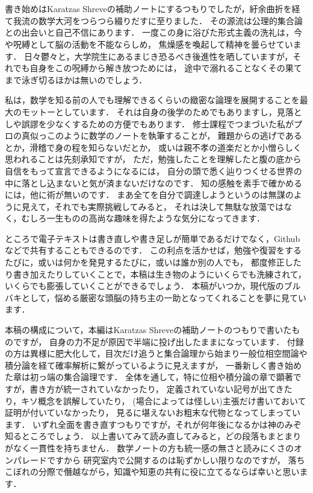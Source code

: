 \chapter*{}
書き始めはKaratzas Shreveの補助ノートにするつもりでしたが，紆余曲折を経て我流の数学大河をつらつら綴りだすに至りました．
その源流は公理的集合論との出会いと自己不信にあります．
一度この身に浴びた形式主義の洗礼は，今や呪縛として脳の活動を不能ならしめ，
焦燥感を喚起して精神を曇らせています．
日々鬱々と，大学院生にあるまじき恐るべき後進性を晒していますが，それでも自身をこの呪縛から解き放つためには，
途中で溺れることなくその果てまで泳ぎ切るほかは無いのでしょう．

私は，数学を知る前の人でも理解できるくらいの緻密な論理を展開することを最大のモットーとしています．
それは自身の後学のためでもありますし，見落としや誤謬を少なくするための方便でもあります．
修士課程でつまづいた私がプロの真似っこのように数学のノートを執筆することが，
難題からの逃げであるとか，滑稽で身の程を知らないだとか，
或いは親不孝の道楽だとか小憎らしく思われることは先刻承知ですが，
ただ，勉強したことを理解したと腹の底から自信をもって宣言できるようになるには，
自分の頭で悉く辿りつくせる世界の中に落とし込まないと気が済まないだけなのです．
知の感触を素手で確かめるには，他に術が無いのです．
まあ全てを自分で調達しようというのは無謀のように見えて，それでも実際挑戦してみると，
それは決して無駄な放蕩ではなく，むしろ一生ものの高尚な趣味を得たような気分になってきます．

ところで電子テキストは書き直しや書き足しが簡単であるだけでなく，Githubなどで共有することもできるのです．
この利点を活かせば，勉強や復習をするたびに，或いは何かを発見するたびに，或いは誰か別の人でも，
都度修正したり書き加えたりしていくことで，本稿は生き物のようにいくらでも洗練されて，
いくらでも膨張していくことができるでしょう．
本稿がいつか，現代版のブルバキとして，悩める厳密な頭脳の持ち主の一助となってくれることを夢に見ています．

本稿の構成について，本編はKaratzas Shreveの補助ノートのつもりで書いたものですが，
自身の力不足が原因で半端に投げ出したままになっています．
付録の方は異様に肥大化して，目次だけ追うと集合論理から始まり一般位相空間論や積分論を経て確率解析に繋がっているように見えますが，
一番新しく書き始めた章は初っ端の集合論理です．
全体を通して，特に位相や積分論の章で顕著ですが，書き方が統一されていなかったり，
定義されていない記号が出てきたり，キソ概念を誤解していたり，
(場合によっては怪しい)主張だけ書いておいて証明が付いていなかったり，
見るに堪えないお粗末な代物となってしまっています．
いずれ全面を書き直すつもりですが，それが何年後になるかは神のみぞ知るところでしょう．
以上書いてみて読み直してみると，どの段落もまとまりがなく一貫性を持ちません．
数学ノートの方も統一感の無さと読みにくさのオンパレードですから
研究室内で公開するのは恥ずかしい限りなのですが，
落ちこぼれの分際で僭越ながら，知識や知恵の共有に役に立てるならば幸いと思います．
\\
\\
\\
